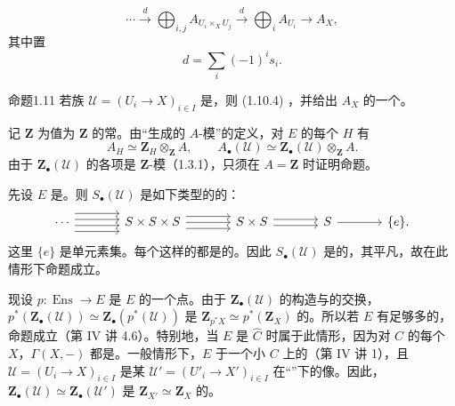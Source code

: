 \[
 \cdots\xrightarrow{d}\bigoplus_{i,j}A_{U_i\times_XU_j}
 \xrightarrow{d}\bigoplus_i A_{U_i}\longrightarrow A_X,\tag{1.10.4}
\]
其中置
\[
 d=\sum_i(-1)^is_i.\tag{1.10.5}
\]
\begin{SGAresult}{命题}{1.11}
若族 $\mathcal U=(U_i\to X)_{i\in I}$ 是，则 (1.10.4) ，并给出 $A_X$ 的一个。
\end{SGAresult}
记 $\mathbf Z$ 为值为 $\mathbf Z$ 的常。由“生成的 $A$-模”的定义，对 $E$ 的每个 $H$ 有
\[
 A_H\simeq\mathbf Z_H\otimes_{\mathbf Z}A,
 \qquad A_\bullet(\mathcal U)\simeq\mathbf Z_\bullet(\mathcal U)\otimes_{\mathbf Z}A.
\]
由于 $\mathbf Z_\bullet(\mathcal U)$ 的各项是 $\mathbf Z$-模（1.3.1），只须在 $A=\mathbf Z$ 时证明命题。

先设 $E$ 是。则 $S_\bullet(\mathcal U)$ 是如下类型的的：
\[
\begin{tikzcd}[column sep=large]
\cdots\arrow[r,shift left=3]\arrow[r,shift left=1]\arrow[r,shift right=1]\arrow[r,shift right=3]&
 S\times S\times S\arrow[r,shift left=2]\arrow[r]\arrow[r,shift right=2]&
 S\times S\arrow[r,shift left=1]\arrow[r,shift right=1]&S\arrow[r]&\{e\}.
\end{tikzcd}
\]
这里 $\{e\}$ 是单元素集。每个这样的都是的。因此 $S_\bullet(\mathcal U)$ 是的，其平凡，故在此情形下命题成立。

现设 $p:\operatorname{Ens}\to E$ 是 $E$ 的一个点。由于 $\mathbf Z_\bullet(\mathcal U)$ 的构造与的交换，
$p^*(\mathbf Z_\bullet(\mathcal U))\simeq\mathbf Z_\bullet(p^*(\mathcal U))$ 是 $\mathbf Z_{p^*X}\simeq p^*(\mathbf Z_X)$ 的。所以若 $E$ 有足够多的，命题成立（第 IV 讲 4.6）。特别地，当 $E$ 是 $\widehat C$ 时属于此情形，因为对 $C$ 的每个 $X$，$\Gamma(X,-)$ 都是。一般情形下，$E$ 于一个小 $C$ 上的（第 IV 讲 1），且 $\mathcal U=(U_i\to X)_{i\in I}$ 是某 $\mathcal U'=(U'_i\to X')_{i\in I}$ 在“”下的像。因此，$\mathbf Z_\bullet(\mathcal U)\simeq\mathbf Z_\bullet(\mathcal U')$ 是 $\mathbf Z_{X'}\simeq\mathbf Z_X$ 的。

